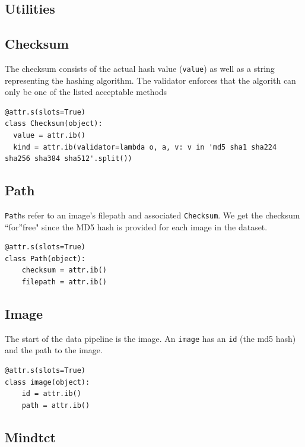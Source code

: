 \subsection{Utilities}\label{utilities}

\subsection{Checksum}\label{checksum}

The checksum consists of the actual hash value (\texttt{value}) as well
as a string representing the hashing algorithm. The validator enforces
that the algorith can only be one of the listed acceptable methods

\begin{lstlisting}
@attr.s(slots=True)
class Checksum(object):
  value = attr.ib()
  kind = attr.ib(validator=lambda o, a, v: v in 'md5 sha1 sha224 sha256 sha384 sha512'.split())
\end{lstlisting}

\subsection{Path}\label{path}

\texttt{Path}s refer to an image's filepath and associated
\texttt{Checksum}. We get the checksum ``for''free" since the MD5 hash
is provided for each image in the dataset.

\begin{lstlisting}
@attr.s(slots=True)
class Path(object):
    checksum = attr.ib()
    filepath = attr.ib()
\end{lstlisting}

\subsection{Image}\label{image}

The start of the data pipeline is the image. An \texttt{image} has an
\texttt{id} (the md5 hash) and the path to the image.

\begin{lstlisting}
@attr.s(slots=True)
class image(object):
    id = attr.ib()
    path = attr.ib()
\end{lstlisting}

\subsection{Mindtct}\label{mindtct}

